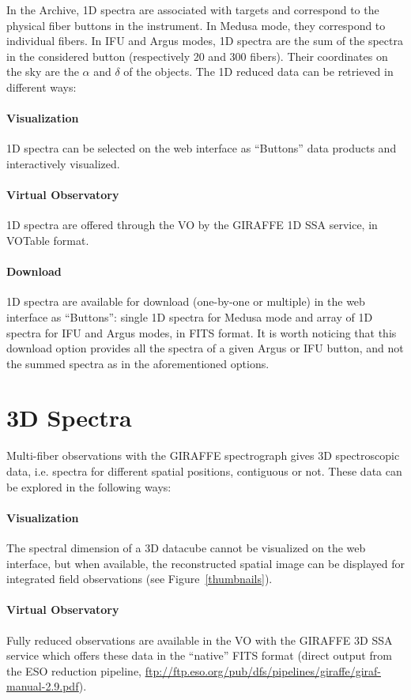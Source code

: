 In the Archive, 1D spectra are associated with targets and correspond to the physical fiber buttons in the instrument. In Medusa mode, they correspond to individual fibers. In IFU and Argus modes, 1D spectra are the sum of the spectra in the considered button (respectively 20 and 300 fibers). Their coordinates on the sky are the $\alpha$ and $\delta$ of the objects. The 1D reduced data can be retrieved in different ways:
\paragraph{Visualization} 1D spectra can be selected on the web interface as ``Buttons'' data products and interactively visualized.
\paragraph{Virtual Observatory} 1D spectra are offered through the VO by the GIRAFFE 1D SSA service, in VOTable format.
\paragraph{Download} 1D spectra are available for download (one-by-one or multiple) in the web interface as ``Buttons'': single 1D spectra for Medusa mode and array of 1D spectra for IFU and Argus modes, in FITS format. It is worth noticing that this download option provides all the spectra of a given Argus or IFU button, and not the summed spectra as in the aforementioned options. 

\section{3D Spectra}

Multi-fiber observations with the GIRAFFE spectrograph gives 3D spectroscopic data, i.e. spectra for different spatial positions, contiguous or not. These data can be explored in the following ways:
\paragraph{Visualization} The spectral dimension of a 3D datacube cannot be visualized on the web interface, but when available, the reconstructed spatial image can be displayed for integrated field observations (see Figure~\ref{thumbnails}).
\paragraph{Virtual Observatory} Fully reduced observations are available in the VO with the GIRAFFE 3D SSA service which offers these data in the ``native'' FITS format (direct output from the ESO reduction pipeline, \url{ftp://ftp.eso.org/pub/dfs/pipelines/giraffe/giraf-manual-2.9.pdf}).
